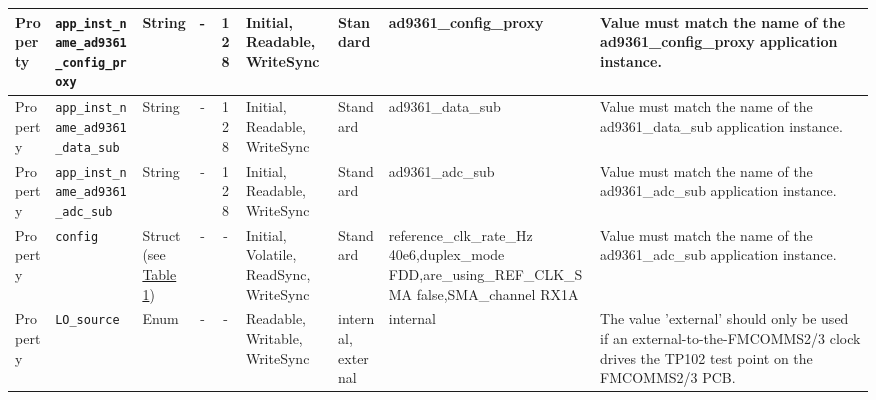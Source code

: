 \documentclass{article}
\begin{document}
\begin{landscape}
\begin{scriptsize}
\begin{longtable}{|p{1.8cm}|p{4.1cm}|p{1cm}|c|c|p{1.6cm}|p{3.7cm}|p{3.7cm}|p{2.5cm}|}
			\hline
			Property & \verb+app_inst_name_ad9361_config_proxy+ &String& -        & 128        & Initial, Readable, WriteSync & Standard & ad9361\_config\_proxy & Value must match the name of the ad9361\_config\_proxy application instance. \\
			\hline
			Property & \verb+app_inst_name_ad9361_data_sub+ &String& -        & 128        & Initial, Readable, WriteSync & Standard & ad9361\_data\_sub & Value must match the name of the ad9361\_data\_sub application instance. \\
			\hline
			Property & \verb+app_inst_name_ad9361_adc_sub+ &String& -        & 128        & Initial, Readable, WriteSync & Standard & ad9361\_adc\_sub & Value must match the name of the ad9361\_adc\_sub application instance. \\
			\hline
			Property & \verb+config+ & Struct (see \hyperlink{tab1}{Table 1}) & -        & -        & Initial, Volatile, ReadSync, WriteSync & Standard & reference\_clk\_rate\_Hz 40e6,duplex\_mode FDD,are\_using\_REF\_CLK\_SMA false,SMA\_channel RX1A & Value must match the name of the ad9361\_adc\_sub application instance. \\
			\hline
			Property & \verb+LO_source+ &Enum& -        & -        & Readable, Writable, WriteSync & internal, external  & internal & The value 'external' should only be used if an external-to-the-FMCOMMS2/3 clock drives the TP102 test point on the FMCOMMS2/3 PCB. \\
			\hline
		\end{longtable}
	\end{scriptsize}
	

\end{landscape}
\end{document}
